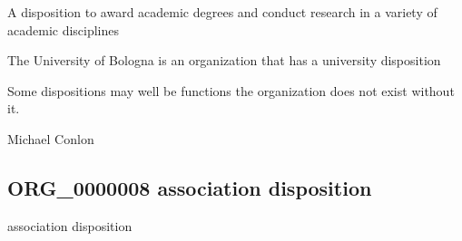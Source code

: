 \documentclass[letterpaper,10pt,english]{sphinxmanual}
\begin{document}
\begin{sphinxShadowBox}

\sphinxAtStartPar
A disposition to award academic degrees and conduct research in a variety of academic disciplines
\end{sphinxShadowBox}

\begin{sphinxShadowBox}

\sphinxAtStartPar
{}
\end{sphinxShadowBox}

\begin{sphinxShadowBox}

\sphinxAtStartPar
The University of Bologna is an organization that has a university disposition
\end{sphinxShadowBox}

\begin{sphinxShadowBox}

\sphinxAtStartPar
Some dispositions may well be functions \textendash{} the organization does not exist without it.
\end{sphinxShadowBox}

\begin{sphinxShadowBox}

\sphinxAtStartPar
{}
\end{sphinxShadowBox}

\begin{sphinxShadowBox}

\sphinxAtStartPar
Michael Conlon 
\end{sphinxShadowBox}
\begin{quote}

\ignorespaces \end{quote}


\subsection{ORG\_0000008 \sphinxhyphen{} association disposition}
\label{\detokenize{doc-ORG_0000008:org-0000008-association-disposition}}\label{\detokenize{doc-ORG_0000008:index-0}}\label{\detokenize{doc-ORG_0000008::doc}}
\begin{sphinxShadowBox}

\sphinxAtStartPar
association disposition
\end{sphinxShadowBox}
\end{document}
